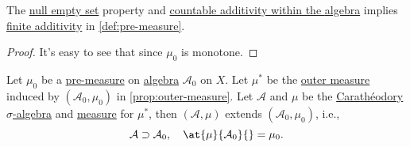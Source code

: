 \begin{lemma}
	The \hyperref[def:pre-measure-null-empty-set]{null empty set} property and \hyperref[def:pre-measure-countable-additivity-within-the-algebra]{countable additivity within the \hyperref[def:algebra]{algebra}}
	implies \hyperref[def:pre-measure-finite-additivity]{finite additivity} in \autoref{def:pre-measure}.
\end{lemma}
\begin{proof}
	It's easy to see that since \(\mu _0\) is monotone.
\end{proof}

\begin{theorem}\label{thm:Hahn-Kolmogorov-Thm}
	Let \(\mu_0\) be a \hyperref[def:pre-measure]{pre-measure} on \hyperref[def:algebra]{algebra} \(\mathcal{A} _0\) on \(X\).
	Let \(\mu^{*} \) be the \hyperref[def:outer-measure]{outer measure} induced by \((\mathcal{A} _0, \mu_0)\) in \autoref{prop:outer-measure}.
	Let \(\mathcal{A}\) and \(\mu\) be the \hyperref[thm:Caratheodory-extension-Thm]{Carathéodory \(\sigma\)-algebra} and \hyperref[def:measure]{measure} for \(\mu^{*} \), then
	\((\mathcal{A} , \mu)\) extends \((\mathcal{A} _0, \mu_0)\), i.e.,
	\[
		\mathcal{A} \supset \mathcal{A} _0,\quad \at{\mu}{\mathcal{A}_0 }{} = \mu_0.
	\]
\end{theorem}
